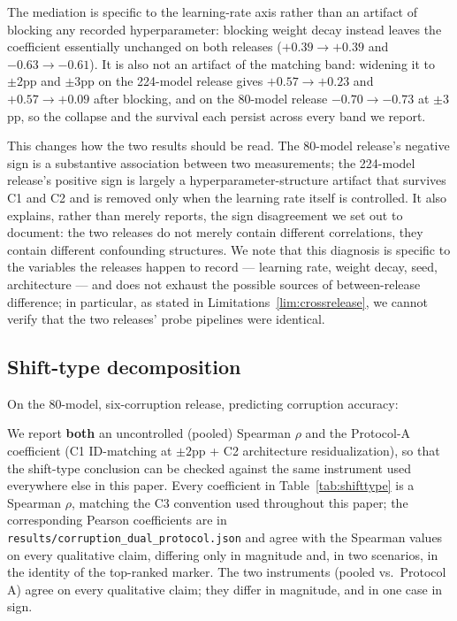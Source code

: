 \documentclass[10pt]{article} %
\newcommand{\limref}[1]{Limitations~\ref{#1}}
\begin{document}
The mediation is specific to the learning-rate axis rather than an artifact of blocking any recorded hyperparameter: blocking weight decay instead leaves the coefficient essentially unchanged on both releases ($+0.39 \rightarrow +0.39$ and $-0.63 \rightarrow -0.61$). It is also not an artifact of the matching band: widening it to $\pm2$pp and $\pm3$pp on the 224-model release gives $+0.57 \rightarrow +0.23$ and $+0.57 \rightarrow +0.09$ after blocking, and on the 80-model release $-0.70 \rightarrow -0.73$ at $\pm3$pp, so the collapse and the survival each persist across every band we report.

This changes how the two results should be read. The 80-model release's negative sign is a substantive association between two measurements; the 224-model release's positive sign is largely a hyperparameter-structure artifact that survives C1 and C2 and is removed only when the learning rate itself is controlled. It also explains, rather than merely reports, the sign disagreement we set out to document: the two releases do not merely contain different correlations, they contain different confounding structures. We note that this diagnosis is specific to the variables the releases happen to record --- learning rate, weight decay, seed, architecture --- and does not exhaust the possible sources of between-release difference; in particular, as stated in \limref{lim:crossrelease}, we cannot verify that the two releases' probe pipelines were identical.

\subsection{Shift-type decomposition}
\label{sub:shifttype}

On the 80-model, six-corruption release, predicting corruption accuracy:

We report \textbf{both} an uncontrolled (pooled) Spearman $\rho$ and the Protocol-A coefficient (C1 ID-matching at $\pm2$pp + C2 architecture residualization), so that the shift-type conclusion can be checked against the same instrument used everywhere else in this paper. Every coefficient in Table~\ref{tab:shifttype} is a Spearman $\rho$, matching the C3 convention used throughout this paper; the corresponding Pearson coefficients are in \texttt{results/corruption\_dual\_protocol.json} and agree with the Spearman values on every qualitative claim, differing only in magnitude and, in two scenarios, in the identity of the top-ranked marker. The two instruments (pooled vs.\ Protocol A) agree on every qualitative claim; they differ in magnitude, and in one case in sign.
\end{document}
